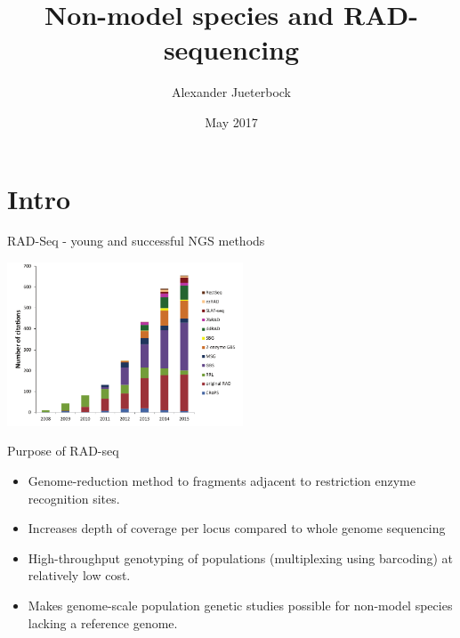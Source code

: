 \documentclass[presentation]{beamer}
\author{Alexander Jueterbock}
\date{May 2017}
\title{Non-model species and RAD-sequencing}
\begin{document}
\maketitle



\section{Intro}
\label{sec-1}
\begin{frame}[label=sec-1-0-1]{RAD-Seq - young and successful NGS methods}
\begin{center}


\includegraphics[width=7cm]{Andrews2016Sup1.png}

\tiny{\citep{Andrews2016}}
\end{center}
\end{frame}


\begin{frame}[label=sec-1-0-2]{Purpose of RAD-seq}
\begin{itemize}
\item Genome-reduction method to fragments adjacent to restriction enzyme
recognition sites.
\item Increases depth of coverage per locus compared to whole genome
sequencing
\item High-throughput genotyping of populations (multiplexing using
barcoding) at relatively low cost.
\item Makes genome-scale population genetic studies possible for non-model
species lacking a reference genome.
\end{itemize}
\end{frame}
\end{document}
